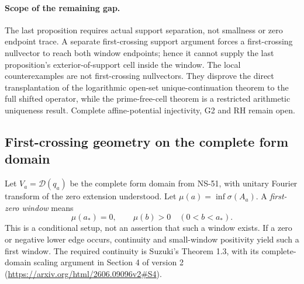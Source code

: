 \documentclass[11pt]{article}
\theoremstyle{remark}
\begin{document}
\paragraph{Scope of the remaining gap.}
The last proposition requires actual support separation, not smallness
or zero endpoint trace. A separate first-crossing support argument forces
a first-crossing nullvector to reach both window endpoints; hence it
cannot supply the last proposition's exterior-of-support cell inside
the window. The local counterexamples are not first-crossing nullvectors.
They disprove the direct transplantation of the logarithmic open-set
unique-continuation theorem to the full shifted operator, while the
prime-free-cell theorem is a restricted arithmetic uniqueness result.
Complete affine-potential injectivity, G2 and RH remain open.

\subsection*{First-crossing geometry on the complete form domain}

Let $V_a=\mathcal D(q_a)$ be the complete form domain from NS-51,
with unitary Fourier transform of the zero extension understood.
Let $\mu(a)=\inf\sigma(A_a)$. A \emph{first-zero window} means
\begin{equation}\label{eq:ns55fc-first}
 \mu(a_*)=0,\qquad \mu(b)>0\quad(0<b<a_*).
\end{equation}
This is a conditional setup, not an assertion that such a window exists.
If a zero or negative lower edge occurs, continuity and small-window
positivity yield such a first window. The required continuity is
Suzuki's Theorem 1.3, with its complete-domain scaling argument in
Section 4 of version 2
(\url{https://arxiv.org/html/2606.09096v2#S4}).
\end{document}
